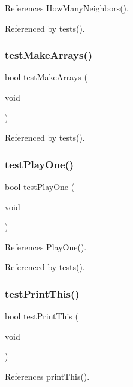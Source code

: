 References How\+Many\+Neighbors().



Referenced by tests().

\mbox{\label{tests_8c_af6e338851f3ccb4714e1bfb06ec4b428}} 
\subsubsection{test\+Make\+Arrays()}
{\footnotesize\ttfamily bool test\+Make\+Arrays (\begin{DoxyParamCaption}\item[{void}]{ }\end{DoxyParamCaption})}



Referenced by tests().

\mbox{\label{tests_8c_aa4c8095a20d90a18d843ab63ecd02d00}} 
\subsubsection{test\+Play\+One()}
{\footnotesize\ttfamily bool test\+Play\+One (\begin{DoxyParamCaption}\item[{void}]{ }\end{DoxyParamCaption})}



References Play\+One().



Referenced by tests().

\mbox{\label{tests_8c_a0f6883340105133a6b03dfc5ebcf4b54}} 
\subsubsection{test\+Print\+This()}
{\footnotesize\ttfamily bool test\+Print\+This (\begin{DoxyParamCaption}\item[{void}]{ }\end{DoxyParamCaption})}



References print\+This().



